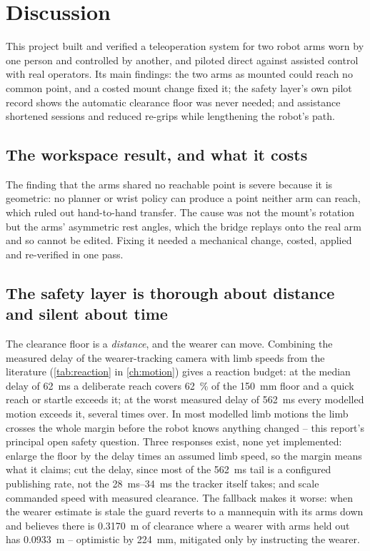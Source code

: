 \chapter{Discussion}
\label{ch:discussionmain}

This project built and verified a teleoperation system for two robot arms
worn by one person and controlled by another, and piloted direct against
assisted control with real operators. Its
main findings: the two arms as mounted could reach no common point, and a
costed mount change fixed it; the safety layer's own pilot record shows the
automatic clearance floor was never needed; and assistance shortened
sessions and reduced re-grips while lengthening the robot's path.

\section{The workspace result, and what it costs}

The finding that the arms shared no reachable point is severe because it is
geometric: no planner or wrist policy can produce a point neither arm can
reach, which ruled out hand-to-hand transfer. The cause was not the mount's rotation but the arms' asymmetric rest
angles, which the bridge replays onto the real arm and so cannot be edited. Fixing it needed a mechanical change,
costed, applied and re-verified in one pass.

\section{The safety layer is thorough about distance and silent about time}

The clearance floor is a \emph{distance}, and the wearer can move.
Combining the measured delay of the wearer-tracking camera with limb speeds
from the literature (\cref{tab:reaction} in \cref{ch:motion}) gives a
reaction budget: at the median delay of \SI{62}{\milli\second} a deliberate
reach covers \SI{62}{\percent} of the \SI{150}{\milli\metre} floor and a
quick reach or startle exceeds it; at the worst measured delay of
\SI{562}{\milli\second} every modelled motion exceeds it, several times
over. In most modelled limb motions the limb crosses the whole margin
before the robot knows anything changed -- this report's principal open
safety question. Three
responses exist, none yet implemented: enlarge the floor by the delay times
an assumed limb speed, so the margin means what it claims; cut the delay, since most of the \SI{562}{\milli\second}
tail is a configured publishing rate, not the \SIrange{28}{34}{\milli\second}
the tracker itself takes; and scale commanded speed with measured
clearance. The fallback makes it worse: when the wearer estimate is stale the guard
reverts to a mannequin with its arms down and believes there is
\SI{0.3170}{\metre} of clearance where a wearer with arms held out has
\SI{0.0933}{\metre} -- optimistic by \SI{224}{\milli\metre}, mitigated only
by instructing the wearer.

